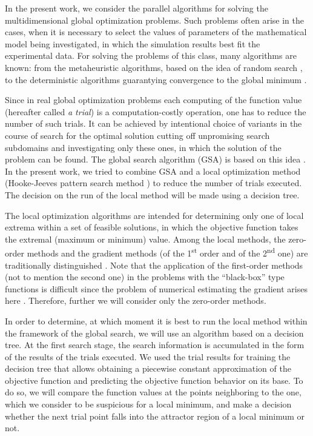 \documentclass{svproc}
\begin{document}
In the present work, we consider the parallel algorithms for solving the multidimensional global optimization problems. Such problems often arise in the cases, when it is necessary to select the values  of parameters of the mathematical model being investigated, in which the simulation results best fit the experimental data. For solving the problems of this class, many algorithms are known: from the metaheuristic algorithms, based on the  idea of random search \cite{Ferreiro2013,Garcia2014,Langdon2011}, to the deterministic algorithms guarantying convergence to the global minimum \cite{Evtushenko2009,He2008,Paulavicius2011}.  

Since in real global optimization problems each computing of the function value (hereafter called  \textit{a trial}) is a computation-costly operation, one has to reduce the number of such trials. It  can be achieved by intentional choice of variants in the course of search for the optimal solution cutting  off unpromising search subdomains and investigating only these ones, in which the solution of the  problem can be found. The global search algorithm (GSA) is based on this idea \cite{Strongin2000}. In  the present work, we tried to combine GSA and a local optimization method (Hooke-Jeeves pattern search method \cite{HookJeeves}) to reduce the number of trials executed. The decision on the run of the local method will be made using a decision tree.

The local optimization algorithms are intended for determining only one of local extrema within a set  of feasible solutions, in which the objective function takes the extremal (maximum or minimum) value.  Among the local methods,  the zero-order methods and the gradient methods (of the 1\textsuperscript{st} order and of the  2\textsuperscript{nd} one) are traditionally distinguished \cite{Nocedal}. Note that the application of the first-order methods (not to mention the second one) in the problems  with the ``black-box'' type functions is difficult since the problem of numerical estimating the gradient arises here \cite{Kelley}. Therefore, further we will consider only the zero-order methods. 

In order to determine,  at which moment it is best to run the local method within the framework of the  global search, we will use an algorithm based on a decision tree. At the first search stage, the search information is accumulated in the form of the results of the trials  executed. We used the trial results for training the decision tree that allows obtaining a piecewise constant approximation of the objective function and predicting the objective function behavior on its base.  To do so, we will compare the function values at the points neighboring to the one, which we consider  to be suspicious for a local minimum, and make a decision  whether the next trial point falls into the attractor region of a local minimum or not.
\end{document}
